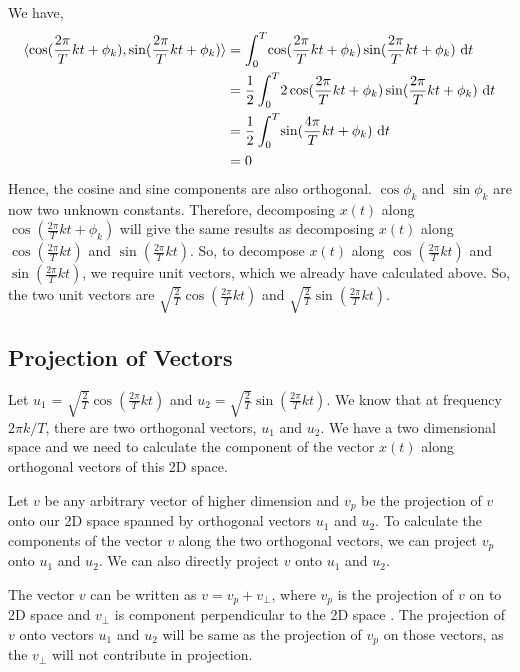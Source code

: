 \noindent
We have,
\begin{align*}
  \langle \cos (\frac{2\pi}{T}kt + \phi_k), \sin (\frac{2\pi}{T}kt + \phi_k) \rangle &= \int_{0}^{T} \! \cos (\frac{2\pi}{T}kt + \phi_k) \sin (\frac{2\pi}{T}kt + \phi_k) \ \dm t  \\
  &= \frac{1}{2} \int_{0}^{T} \! 2 \cos (\frac{2\pi}{T}kt + \phi_k) \sin (\frac{2\pi}{T}kt + \phi_k) \ \dm t \\
  &= \frac{1}{2} \int_{0}^{T} \! \sin (\frac{4\pi}{T}kt + \phi_k) \ \dm t \\
  &= 0
\end{align*}
Hence, the cosine and sine components are also orthogonal. $\cos\phi_k$ and $\sin\phi_k$ are now two unknown constants.
Therefore, decomposing $x(t)$ along $\cos (\frac{2\pi}{T}kt + \phi_k)$ will give the same results as decomposing $x(t)$ along  $\cos (\frac{2\pi}{T}kt)$ and $\sin (\frac{2\pi}{T}kt)$. So, to decompose $x(t)$ along $\cos (\frac{2\pi}{T}kt)$ and $\sin (\frac{2\pi}{T}kt)$, we require unit vectors, which we already have calculated above.
So, the two unit vectors are $\sqrt{\frac{2}{T}}\cos (\frac{2\pi}{T}kt)$ and $\sqrt{\frac{2}{T}}\sin (\frac{2\pi}{T}kt)$.
\subsection{Projection of Vectors}
Let $u_1$ = $\sqrt{\frac{2}{T}}\cos (\frac{2\pi}{T}kt)$ and $u_2 = \sqrt{\frac{2}{T}}\sin (\frac{2\pi}{T}kt)$. We know that at frequency $2\pi k/T$, there are two orthogonal vectors, $u_1$ and $u_2$. We have a two dimensional space and we need to calculate the component of the vector $x(t)$ along orthogonal vectors of this 2D space.
  
\noindent
 Let $v$ be any arbitrary vector of higher dimension and $v_p$ be the projection of $v$ onto our 2D space spanned by orthogonal vectors $u_1$ and $u_2$. To calculate the components of the vector $v$ along the two orthogonal vectors, we can project $v_p$  onto $u_1$ and $u_2$. We can also directly project $v$ onto $u_1$ and $u_2$.
 


\noindent
 The vector $v$ can be written as $v = v_p  + v_\perp$, where $v_p$ is the projection of $v$ on to 2D space and $v_\perp$ is component perpendicular to the 2D space . The projection of $v$ onto vectors $u_1$ and $u_2$ will be same as the projection of $v_p$  on those vectors, as the $v_\perp$ will not contribute in projection.
 
